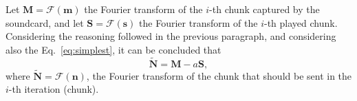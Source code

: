 Let ${\mathbf M} = {\mathcal F}({\mathbf m})$ the Fourier transform of
the $i$-th chunk captured by the soundcard, and let
${\mathbf S} = {\mathcal F}({\mathbf s})$ the Fourier transform of the
$i$-th played chunk. Considering the reasoning followed in the
previous paragraph, and considering also the Eq.~\eqref{eq:simplest}, it can be concluded that
\begin{equation}
  \tilde{\mathbf N} = {\mathbf M} - a{\mathbf S},
  \label{eq:simplest_fourier}
\end{equation}
where $\tilde{\mathbf N} = {\mathcal F}({\mathbf n})$, the Fourier
transform of the chunk that should be sent in the $i$-th iteration
(chunk).

\begin{comment}
Notice that if you prefer to estimate ${\mathbf h}$ using a ``train''
(a sequence) of impulses, the temporal distance between them would 

  For estimating the feedback signal at the
  sample-time $t$, ${\mathbf f}[t]$, the length of a
  \href{https://en.wikipedia.org/wiki/Finite_impulse_response}{FIR
    filter} should be at least $d$, because at least we need $d$
  samples to detect the feedback signal. Therefore, we have that
\begin{equation}
  \hat{\mathbf s}[t] = \sum_{k=0}^{d-1}{\mathbf h}_k^{(t)}{\mathbf s}[t-k],
  \label{eq:LMS_feedback}
\end{equation}
where ${\mathbf h}$ is the near-end impulse response in the time
domain.

\section{Estimation of the feedback signal using LMS (Least Mean Squares)}
We just have seen how it is possible to find better estimations of the
feedback signal $\hat{\mathbf f}$ using convolutions. By definition,
convolutions are performed by filters. 

As we have seen, 

Also, as we have seen in the previous section, it is possible to adapt
the filter to the acoustic conditions, measuring the echo generated by
the impulse signal. In the time domain, one of the most used
techniques for computing the coefficients of a FIR filter is the
\href{https://en.wikipedia.org/wiki/Least_mean_squares_filter}{LMS
  (Least Mean Squares)
  algorithm}~\cite{haykin1995adaptive,boyd2004convex}, among other
reasons because the filter (coefficients) can be adapted to variations
in the signal to filter (the filter can learn).


\end{comment}
